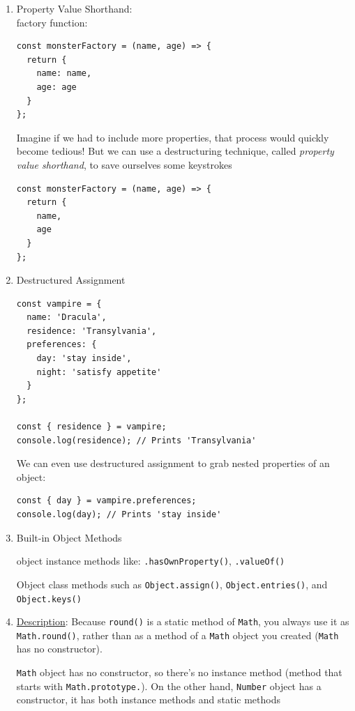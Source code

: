 \documentclass[a4paper, 12pt]{article}
\begin{document}
\begin{enumerate}
\item Property Value Shorthand:\\
factory function:
\begin{verbatim}
const monsterFactory = (name, age) => {
  return { 
    name: name,
    age: age
  }
};
\end{verbatim}

Imagine if we had to include more properties, that process would quickly become tedious! But we can use a destructuring technique, called \textit{property value shorthand}, to save ourselves some keystrokes
\begin{verbatim}
const monsterFactory = (name, age) => {
  return { 
    name,
    age 
  }
};
\end{verbatim}

\item Destructured Assignment
\begin{verbatim}
const vampire = {
  name: 'Dracula',
  residence: 'Transylvania',
  preferences: {
    day: 'stay inside',
    night: 'satisfy appetite'
  }
};

const { residence } = vampire; 
console.log(residence); // Prints 'Transylvania'
\end{verbatim}
We can even use destructured assignment to grab nested properties of an object:
\begin{verbatim}
const { day } = vampire.preferences; 
console.log(day); // Prints 'stay inside'
\end{verbatim}

\item Built-in Object Methods

object instance methods like: \verb|.hasOwnProperty()|, \verb|.valueOf()|

Object class methods such as \verb|Object.assign()|, \verb|Object.entries()|, and\\ \verb|Object.keys()|

\item \href{https://developer.mozilla.org/en-US/docs/Web/JavaScript/Reference/Global_Objects/Math/round#Description}{Description}: Because \verb|round()| is a static method of \verb|Math|, you always use it as \verb|Math.round()|, rather than as a method of a \verb|Math| object you created (\verb|Math| has no constructor).

\verb|Math| object has no constructor, so there's no instance method (method that starts with \verb|Math.prototype.|). On the other hand, \verb|Number| object has a constructor, it has both instance methods and static methods

\end{enumerate}
\end{document}
